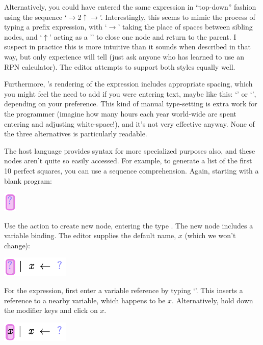 Alternatively, you could have entered the same expression in ``top-down'' fashion using the sequence `$\rightarrow${2}$\uparrow\rightarrow$'. Interestingly, this seems to mimic the process of typing a prefix expression, with `$\rightarrow$' taking the place of spaces between sibling nodes, and `$\uparrow$' acting as a '\clojure{)}' to close one node and return to the parent. I suspect in practice this is more intuitive than it sounds when described in that way, but only experience will tell (just ask anyone who has learned to use an RPN calculator). The editor attempts to support both styles equally well.

Furthermore, \Meta's rendering of the expression includes appropriate spacing, which you might feel the need to add if you were entering text, maybe like this: `' or `', depending on your preference. This kind of manual type-setting is extra work for the programmer (imagine how many hours each year world-wide are spent entering and adjusting white-space!), and it's not very effective anyway. None of the three alternatives is particularly readable.

\vspace{12pt}

The host language provides syntax for more specialized purposes also, and these nodes aren't quite so easily accessed. For example, to generate a list of the first 10 perfect squares, you can use a sequence comprehension. Again, starting with a blank program:
\begin{center}
\includegraphics{src/image/for1.pdf}
\end{center}

Use the  action to create new node, entering the type . The new node includes a variable binding. The editor supplies the default name, $x$ (which we won't change):
\begin{center}
\includegraphics{src/image/for2.pdf}
\end{center}

For the expression, first enter a variable reference by typing `'. This inserts a reference to a nearby variable, which happens to be $x$. Alternatively, hold down the  modifier keys and click on $x$.
\begin{center}
\includegraphics{src/image/for3.pdf}
\end{center}

